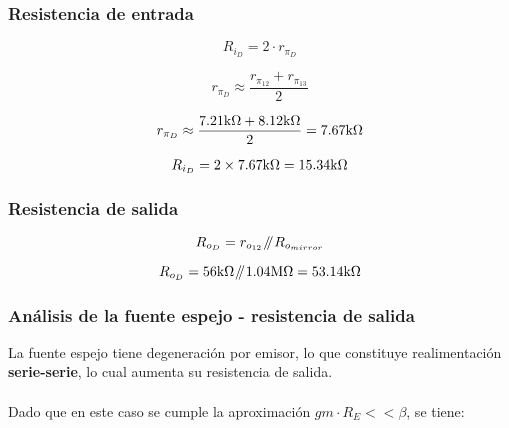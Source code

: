 \subsubsection{Resistencia de entrada}

\begin{equation}
R_{i_{D}} = 2 \cdot r_{\pi_{D}}
\end{equation}

\begin{equation}
r_{\pi_{D}} \approx \frac{r_{\pi_{12}} + r_{\pi_{13}}}{2}
\end{equation}

\begin{equation*}
r_{\pi_{D}} \approx \frac{7.21 \si[per-mode=symbol]{\kilo\ohm} + 8.12 \si[per-mode=symbol]{\kilo\ohm}}{2} = 7.67 \si[per-mode=symbol]{\kilo\ohm}
\end{equation*}

\begin{equation*}
R_{i_{D}} = 2 \times 7.67 \si[per-mode=symbol]{\kilo\ohm} = 15.34 \si[per-mode=symbol]{\kilo\ohm}
\end{equation*}



\subsubsection{Resistencia de salida}

\begin{equation}
R_{o_{D}} = r_{o_{12}} \parallelresistors R_{o_{mirror}}
\end{equation}


\begin{equation*}
R_{o_{D}} = 56 \si[per-mode=symbol]{\kilo\ohm} \parallelresistors 1.04 \si[per-mode=symbol]{\mega\ohm} = 53.14 \si[per-mode=symbol]{\kilo\ohm}
\end{equation*}


\subsubsection{Análisis de la fuente espejo - resistencia de salida}

La fuente espejo tiene degeneración por emisor, lo que constituye realimentación \textbf{serie-serie}, lo cual aumenta su resistencia de salida.\\ \\
Dado que en este caso se cumple la aproximación $gm \cdot R_{E} << \beta$, se tiene:

